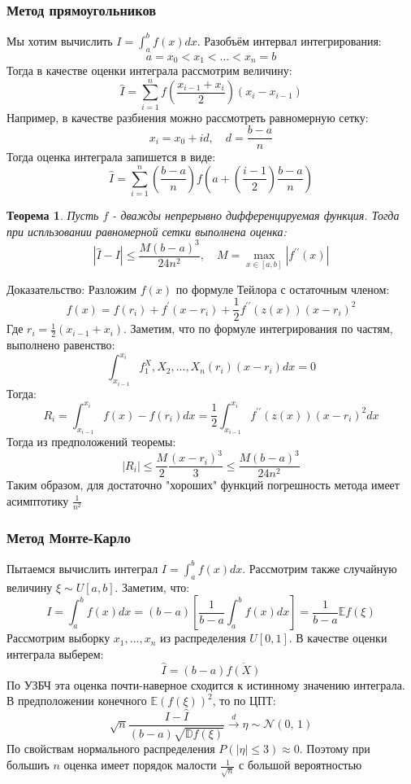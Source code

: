 \documentclass[a4paper,12pt]{article}
\newcommand{\expec}{\mathbb{E}}
\newcommand{\disp}{\mathbb{D}}
\newcommand{\normal}[2]{\mathcal{N}(#1,\,#2)}
\newcommand{\dconv}{\overset{d}{\to}}
\newcommand{\sumin}{\sum\limits_{i=1}^n}
\newcommand{\sample}{X_1, X_2, ..., X_n}
\theoremstyle{named}
\newtheorem*{namedtheorem}{Теорема}
\begin{document}
\subsubsection{Метод прямоугольников}
Мы хотим вычислить $I = \int_{a}^b f(x) dx$. Разобъём интервал интегрирования:
$$
    a = x_0 < x_1 < ... < x_n = b
$$
Тогда в качестве оценки интеграла рассмотрим величину:
$$
    \hat I = \sumin f\left(\frac{x_{i-1} + x_i}{2}\right)(x_i - x_{i-1})
$$
Например, в качестве разбиения можно рассмотреть равномерную сетку:
$$
    x_i = x_0 + id, \quad d = \frac{b-a}{n}
$$
Тогда оценка интеграла запишется в виде:
$$
    \hat I = \sumin \left(\frac{b-a}{n}\right)f\left(a + \left(\frac{i-1}{2}\right)\frac{b-a}{n}\right)
$$
\begin{namedtheorem}
    Пусть $f$ - дважды непрерывно дифференцируемая функция. Тогда при испльзовании равномерной сетки выполнена оценка:
    $$
        |\hat I - I| \leq \frac{M(b-a)^3}{24n^2}, \quad M = \max_{x\in [a, b]}|f^{\prime\prime}(x)|
    $$
\end{namedtheorem}
Доказательство: Разложим $f(x)$ по формуле Тейлора с остаточным членом:
$$
    f(x) = f(r_i) + f^\prime(x - r_i) + \frac{1}{2}f^{\prime\prime}(z(x))(x-r_i)^2
$$
Где $r_i = \frac12(x_{i-1} + x_i)$. Заметим, что по формуле интегрирования по частям, выполнено равенство:
$$
    \int_{x_{i-1}}^{x_i} f^\sample(r_i)(x - r_i)dx = 0
$$
Тогда:
$$
    R_i = \int_{x_{i-1}}^{x_i} f(x) - f(r_i) dx = \frac{1}{2}\int_{x_{i-1}}^{x_i} f^{\prime\prime}(z(x))(x-r_i)^2 dx
$$
Тогда из предположений теоремы:
$$
    |R_i| \leq \frac{M}{2}\frac{(x-r_i)^3}{3} \leq \frac{M(b-a)^3}{24n^2}
$$
Таким образом, для достаточно "хороших" функций погрешность метода имеет асимптотику $\frac{1}{n^2}$
\subsubsection{Метод Монте-Карло}
Пытаемся вычислить интеграл $I = \int_{a}^b f(x) dx$. Рассмотрим также случайную величину $\xi \sim U[a, b]$. 
Заметим, что:
$$
    I = \int_{a}^b f(x) dx = (b-a)\left[\frac{1}{b-a}\int_{a}^b f(x) dx\right] = \frac{1}{b-a}\expec f(\xi)
$$
Рассмотрим выборку $x_1, ..., x_n$ из распределения $U[0, 1]$. В качестве оценки интеграла выберем:
$$
    \hat I = (b-a)\overline{f(X)}
$$
По УЗБЧ эта оценка почти-наверное сходится к истинному значению интеграла. В предположении конечного $\expec(f(\xi))^2$, то 
по ЦПТ:
$$
    \sqrt{n}\frac{I - \hat I}{(b-a)\sqrt{\disp f(\xi)}} \dconv \eta \sim \normal{0}{1}
$$
По свойствам нормального распределения $P(|\eta| \leq 3) \approx 0$. Поэтому при большиъ $n$ оценка имеет порядок малости $\frac{1}{\sqrt{n}}$
с большой вероятностью 
\end{document}
